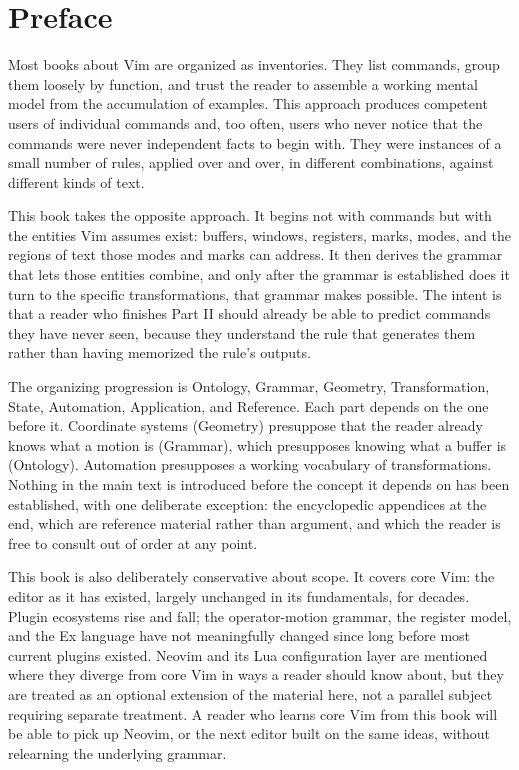 \chapter*{Preface}

Most books about Vim are organized as inventories. They list commands, group them loosely by function, and trust the reader to assemble a working mental model from the accumulation of examples. This approach produces competent users of individual commands and, too often, users who never notice that the commands were never independent facts to begin with. They were instances of a small number of rules, applied over and over, in different combinations, against different kinds of text.

This book takes the opposite approach. It begins not with commands but with the entities Vim assumes exist: buffers, windows, registers, marks, modes, and the regions of text those modes and marks can address. It then derives the grammar that lets those entities combine, and only after the grammar is established does it turn to the specific transformations, that grammar makes possible. The intent is that a reader who finishes Part II should already be able to predict commands they have never seen, because they understand the rule that generates them rather than having memorized the rule's outputs.

The organizing progression is Ontology, Grammar, Geometry, Transformation, State, Automation, Application, and Reference. Each part depends on the one before it. Coordinate systems (Geometry) presuppose that the reader already knows what a motion is (Grammar), which presupposes knowing what a buffer is (Ontology). Automation presupposes a working vocabulary of transformations. Nothing in the main text is introduced before the concept it depends on has been established, with one deliberate exception: the encyclopedic appendices at the end, which are reference material rather than argument, and which the reader is free to consult out of order at any point.

This book is also deliberately conservative about scope. It covers core Vim: the editor as it has existed, largely unchanged in its fundamentals, for decades. Plugin ecosystems rise and fall; the operator-motion grammar, the register model, and the Ex language have not meaningfully changed since long before most current plugins existed. Neovim and its Lua configuration layer are mentioned where they diverge from core Vim in ways a reader should know about, but they are treated as an optional extension of the material here, not a parallel subject requiring separate treatment. A reader who learns core Vim from this book will be able to pick up Neovim, or the next editor built on the same ideas, without relearning the underlying grammar.

